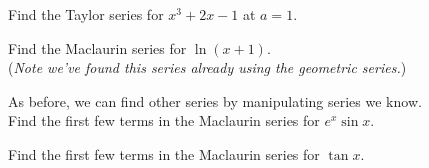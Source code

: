 \documentclass[11pt]{article}
\begin{document}
  \vspace{4in}
  


  
  Find the Taylor series for $x^3+2x-1$ at $a=1$.

\pagebreak


  Find the Maclaurin series for $\ln(x+1)$. \\
   (\emph{Note we've found this series already using the geometric series.})

 \vspace{3.5in}

As before, we can find other series by manipulating series we know.\\

Find the first few terms in the Maclaurin series for $e^x\sin{x}$.\\

 \vspace{2in}

Find the first few terms in the Maclaurin series for $\tan{x}$.\\

%
%  
%
%
\end{document}
